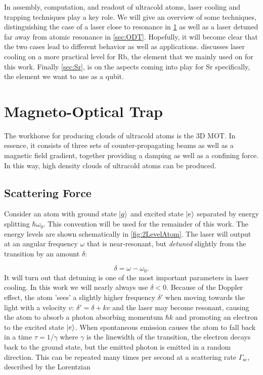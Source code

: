 In assembly, computation, and readout of ultracold atoms, laser cooling and trapping techniques play a key role. 
We will give an overview of some techniques, distinguishing the case of a laser close to resonance in \cref{sec:MOT} as well as a laser detuned far away from atomic resonance in \cref{sec:ODT}.
Hopefully, it will become clear that the two cases lead to different behavior as well as applications.
 discusses laser cooling on a more practical level for Rb, the element that we mainly used on for this work. 
Finally \cref{sec:Sr}, is on the aspects coming into play for Sr specifically, the element we want to use as a qubit.


\section{Magneto-Optical Trap}\label{sec:MOT}

The workhorse for producing clouds of ultracold atoms is the 3D \ac{MOT}. 
In essence, it consists of three sets of counter-propagating beams as well as a magnetic field gradient, together providing a damping as well as a confining force. 
In this way, high density clouds of ultracold atoms can be produced. 

\subsection{Scattering Force}

Consider an atom with ground state $\lvert g\rangle$ and excited state $\lvert e\rangle$ separated by energy splitting $\hbar \omega_0$.
This convention will be used for the remainder of this work.
The energy levels are shown schematically in \cref{fig:2LevelAtom}.
The laser will output at an angular frequency $\omega$ that is near-resonant, but \emph{detuned} slightly from the transition by an amount $\delta$:

\begin{equation}\label{detuning}
	\delta = \omega - \omega_0.
\end{equation}
It will turn out that detuning is one of the most important parameters in laser cooling. 
In this work we will nearly always use $\delta <0$. 
Because of the Doppler effect, the atom 'sees' a slightly higher frequency $\delta'$ when moving towards the light with a velocity $v$: $\delta'=\delta+k v$ and the laser may become resonant, causing the atom to absorb a photon absorbing momentum $\hbar k$ and promoting an electron to the excited state $\lvert e\rangle$.
When spontaneous emission causes the atom to fall back in a time $\tau = 1/\gamma$ where $\gamma$ is the linewidth of the transition, the electron decays back to the ground state, but the emitted photon is emitted in a random direction. 
This can be repeated many times per second at a scattering rate $\Gamma_{\text{sc}}$, described by the Lorentzian \cite{Metcalf1999}

